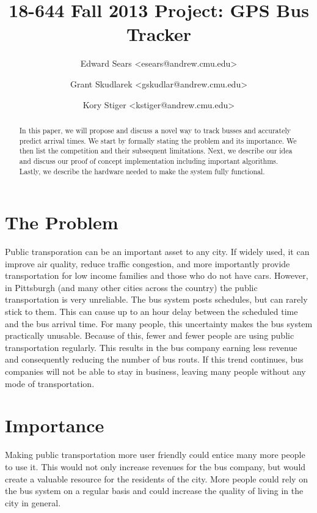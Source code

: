 \documentclass[pageno]{jpaper}
\begin{document}
\title{
18-644 Fall 2013 Project: GPS Bus Tracker}
\author{Edward Sears <esears@andrew.cmu.edu> \and Grant Skudlarek <gskudlar@andrew.cmu.edu> \and Kory Stiger <kstiger@andrew.cmu.edu>}

\date{}
\maketitle

\thispagestyle{empty}

\begin{abstract}
In this paper, we will propose and discuss a novel way to track busses and 
accurately predict arrival times.  We start by formally stating
the problem and its importance.  We then list the competition 
and their subsequent limitations.  Next, we describe our 
idea and discuss our proof of concept implementation including important 
algorithms. Lastly, we describe the hardware needed to make 
the system fully functional.
\end{abstract}

\section{The Problem}

Public transporation can be an important asset to any city. If widely 
used, it can improve air quality, reduce traffic congestion, and more 
importantly provide transportation for low income families \cite{Criden08} and those who 
do not have cars.  However, in Pittsburgh (and many other cities across the country) 
the public transportation is very unreliable.  The bus system posts 
schedules, but can rarely stick to them.  This can cause up to an 
hour delay between the scheduled time and the bus arrival time.  For 
many people, this uncertainty makes the bus system practically unusable.  
Because of this, fewer and fewer people are using public transportation 
regularly.  This results in the bus company earning less revenue and 
consequently reducing the number of bus routs.  If this trend continues, 
bus companies will not be able to stay in business, leaving many people 
without any mode of transportation.

\section{Importance}

Making public transportation more user friendly could entice many more 
people to use it.  This would not only increase revenues for the bus 
company, but would create a valuable resource for the residents of 
the city.  More people could rely on the bus system on a regular basis 
and could increase the quality of living in the city in general.
\end{document}

